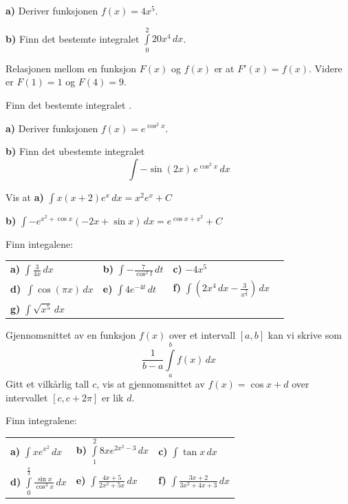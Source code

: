 



	
	
\opgt

\textbf{a)} Deriver funksjonen $ f(x)=4x^5 $.\os

\textbf{b)} Finn det bestemte integralet $ \int\limits_0^2 20 x^4 \, dx $.

Relasjonen mellom en funksjon $ F(x) $ og $f(x) $ er at $ F'(x)=f(x) $. Videre er $ F(1)=1 $ og $ F(4)=9 $.\os

Finn det bestemte integralet .

\textbf{a)} Deriver funksjonen $ f(x)=e^{\cos^2 x} $.\os

\textbf{b)} Finn det ubestemte integralet \[ \int -\sin (2x)\, e^{\cos^2 x}\,dx \]\vs\vs

Vis at\os
\textbf{a)} $\displaystyle \int x(x+2)e^x \,dx = x^2 e^x + C $ \os

\textbf{b)} $\displaystyle \int -e^{x^2+\cos x} (-2 x+\sin x)\,dx= e^{\cos x+x^2}+C  $

\nes

Finn integalene:\os
\begin{tabular}{@{}l l l l}	
\textbf{a)} $ \displaystyle \int \frac{3}{4 x} \,dx$ &\quad \textbf{b)} $ \displaystyle \int-\frac{7}{\cos^2 t}\,dt $ &\quad \textbf{c)} $ -4x^5 $ \\[20 pt]
\textbf{d)}\ $\displaystyle \int \cos(\pi x) \,dx$ & \quad
\textbf{e)} $\displaystyle \int 4e^{-4t} \,dt$ &\quad\textbf{f)} $ \displaystyle \int \left(2x^4\,dx - \frac{3}{x^{\frac{3}{2}}}\right) \,dx$ \\[20pt]
\textbf{g)} $\displaystyle \int \sqrt{x^5}\,dx $
\end{tabular} 
\newpage
{}
Gjennomsnittet av en funksjon $ f(x) $ over et intervall $ [a, b] $ kan vi skrive som
\[ \frac{1}{b-a}\int\limits_a^b f(x)\,dx \]
Gitt et vilkårlig tall $ c $, vis at gjennomsnittet av $f(x)=\cos x+d  $ over intervallet $ [c, c+2\pi] $ er lik $ d $. 

Finn integralene:\os

\begin{tabular}{@{}l l l}	
\textbf{a)} $\displaystyle \int xe^{x^2} \, dx  $ &\;\textbf{b)} $\displaystyle \int\limits_1^2 8xe^{2x^2-3}\,dx $ &\;\textbf{c)} $\displaystyle \int \tan x \, dx $ \\ \vspace{3pt} 
\textbf{d)} $ \displaystyle \int\limits_0^\frac{\pi}{3}\frac{\sin x}{\cos^3 x} \, dx $ &\;\textbf{e)} $ \displaystyle \int \frac{4x+5}{2x^2 + 5x}\,dx $
&\;\textbf{f)} $ \displaystyle \int \frac{3x+2}{3x^2 + 4x+3}\,dx $
\end{tabular} 

